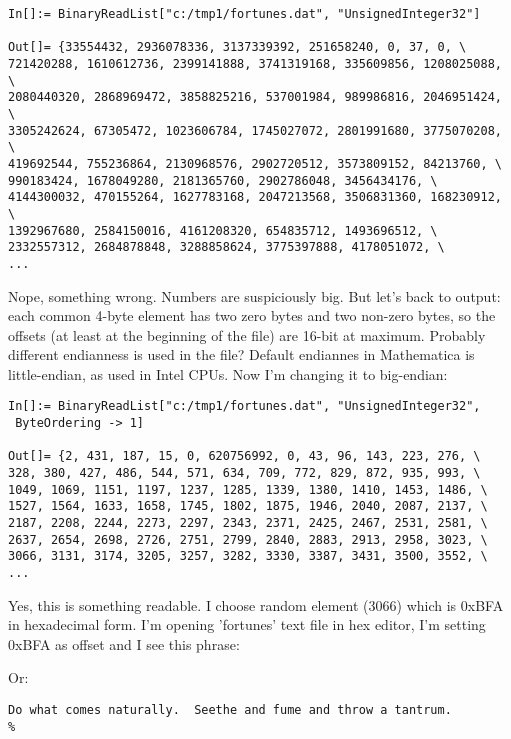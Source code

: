 \begin{lstlisting}[style=custommath]
In[]:= BinaryReadList["c:/tmp1/fortunes.dat", "UnsignedInteger32"]

Out[]= {33554432, 2936078336, 3137339392, 251658240, 0, 37, 0, \
721420288, 1610612736, 2399141888, 3741319168, 335609856, 1208025088, \
2080440320, 2868969472, 3858825216, 537001984, 989986816, 2046951424, \
3305242624, 67305472, 1023606784, 1745027072, 2801991680, 3775070208, \
419692544, 755236864, 2130968576, 2902720512, 3573809152, 84213760, \
990183424, 1678049280, 2181365760, 2902786048, 3456434176, \
4144300032, 470155264, 1627783168, 2047213568, 3506831360, 168230912, \
1392967680, 2584150016, 4161208320, 654835712, 1493696512, \
2332557312, 2684878848, 3288858624, 3775397888, 4178051072, \
...
\end{lstlisting}

Nope, something wrong. Numbers are suspiciously big.
But let's back to \IT{od} output: each common 4-byte element has two zero bytes and two non-zero bytes, so the offsets (at least at the beginning of the file) are 16-bit at maximum.
Probably different endianness is used in the file?
Default endiannes in Mathematica is little-endian, as used in Intel CPUs.
Now I'm changing it to big-endian:

\begin{lstlisting}[style=custommath]
In[]:= BinaryReadList["c:/tmp1/fortunes.dat", "UnsignedInteger32", 
 ByteOrdering -> 1]

Out[]= {2, 431, 187, 15, 0, 620756992, 0, 43, 96, 143, 223, 276, \
328, 380, 427, 486, 544, 571, 634, 709, 772, 829, 872, 935, 993, \
1049, 1069, 1151, 1197, 1237, 1285, 1339, 1380, 1410, 1453, 1486, \
1527, 1564, 1633, 1658, 1745, 1802, 1875, 1946, 2040, 2087, 2137, \
2187, 2208, 2244, 2273, 2297, 2343, 2371, 2425, 2467, 2531, 2581, \
2637, 2654, 2698, 2726, 2751, 2799, 2840, 2883, 2913, 2958, 3023, \
3066, 3131, 3174, 3205, 3257, 3282, 3330, 3387, 3431, 3500, 3552, \
...
\end{lstlisting}

Yes, this is something readable.
I choose random element (3066) which is 0xBFA in hexadecimal form.
I'm opening 'fortunes' text file in hex editor, I'm setting 0xBFA as offset and I see this phrase:



Or:

\begin{lstlisting}
Do what comes naturally.  Seethe and fume and throw a tantrum.
%
\end{lstlisting}

